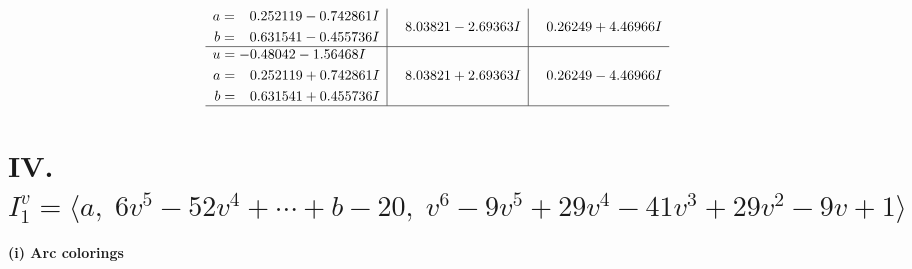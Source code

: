 \documentclass[1p]{elsarticle_modified}
\theoremstyle{definition}
\begin{document}
$$\begin{array}{c|c|c}
\begin{aligned}
a &= \phantom{-}0.252119 - 0.742861 I \\
b &= \phantom{-}0.631541 - 0.455736 I\end{aligned}
 & \phantom{-}8.03821 - 2.69363 I & \phantom{-}0.26249 + 4.46966 I \\ \hline\begin{aligned}
u &= -0.48042 - 1.56468 I \\
a &= \phantom{-}0.252119 + 0.742861 I \\
b &= \phantom{-}0.631541 + 0.455736 I\end{aligned}
 & \phantom{-}8.03821 + 2.69363 I & \phantom{-}0.26249 - 4.46966 I\\
 \hline 
 \end{array}$$\newpage\newpage\renewcommand{\arraystretch}{1}
\centering \section*{IV. $I^v_{1}= \langle a,\;6 v^5-52 v^4+\cdots+b-20,\;v^6-9 v^5+29 v^4-41 v^3+29 v^2-9 v+1 \rangle$}
\flushleft \textbf{(i) Arc colorings}\\
\end{document}
